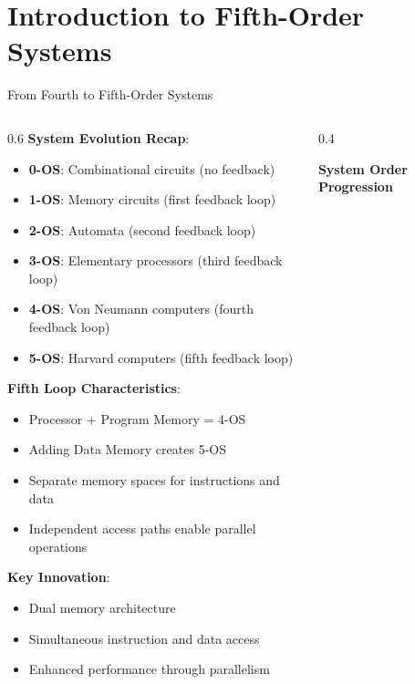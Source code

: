 \documentclass[aspectratio=169]{beamer}
\newcommand{\concept}[1]{\textbf{\color{darkblue}#1}}
\begin{document}
\section{Introduction to Fifth-Order Systems}

\begin{frame}{From Fourth to Fifth-Order Systems}
\begin{columns}
\begin{column}{0.6\textwidth}
\concept{System Evolution Recap}:
\begin{itemize}
\item \textbf{0-OS}: Combinational circuits (no feedback)
\item \textbf{1-OS}: Memory circuits (first feedback loop)
\item \textbf{2-OS}: Automata (second feedback loop)
\item \textbf{3-OS}: Elementary processors (third feedback loop)
\item \textbf{4-OS}: Von Neumann computers (fourth feedback loop)
\item \textbf{5-OS}: Harvard computers (fifth feedback loop)
\end{itemize}

\vspace{0.3cm}
\concept{Fifth Loop Characteristics}:
\begin{itemize}
\item Processor + Program Memory = 4-OS
\item Adding Data Memory creates 5-OS
\item Separate memory spaces for instructions and data
\item Independent access paths enable parallel operations
\end{itemize}

\vspace{0.3cm}
\concept{Key Innovation}:
\begin{itemize}
\item Dual memory architecture
\item Simultaneous instruction and data access
\item Enhanced performance through parallelism
\end{itemize}
\end{column}
\begin{column}{0.4\textwidth}
\begin{center}
\textbf{System Order Progression}
\vspace{0.3cm}


\end{center}
\end{column}
\end{columns}
\end{frame}
\end{document}
